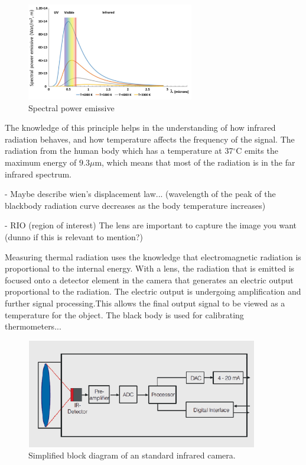 \begin{figure}[H]
	\centering	\includegraphics[width=0.65\textwidth]{figures/Spectral_power_emissive}
	\caption{Spectral power emissive\cite{ignacio2017}}
	\label{fig:Spectral}
\end{figure} \vspace{-.3cm}

The knowledge of this principle helps in the understanding of how infrared radiation behaves, and how temperature affects the frequency of the signal. 
The radiation from the human body which has a temperature at 37$^{\circ}$C emits the maximum energy of $9.3 \mu$m, which means that most of the radiation is in the far infrared spectrum.

- Maybe describe wien's displacement law... (wavelength of the peak of the blackbody radiation curve decreases as the body temperature increases)

- RIO (region of interest)
The lens are important to capture the image you want (dunno if this is relevant to mention?)



Measuring thermal radiation uses the knowledge that electromagnetic radiation is proportional to the internal energy. With a lens, the radiation that is emitted is focused onto a detector element in the camera that generates an electric output proportional to the radiation. The electric output is undergoing amplification and further signal processing.This allows the final output signal to be viewed as a temperature for the object. \cite{optris2009}
The black body is used for calibrating thermometers...

\begin{figure}[H]                                         
	\includegraphics[width=.55\textwidth]{figures/IR_cam}  
	\caption{Simplified block diagram of an standard infrared camera.\cite{optris2009}}
	\label{fig:em_spectrum}  
\end{figure} 




